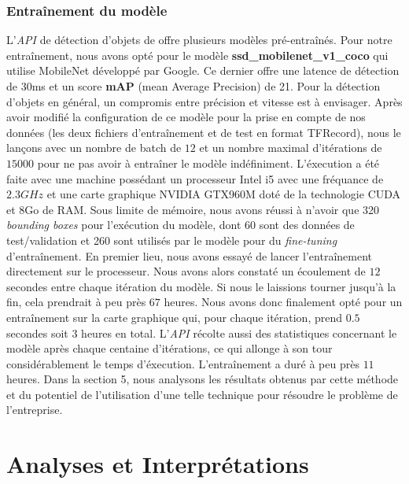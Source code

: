 \documentclass[french]{article}
\theoremstyle{mytheoremstyle}
\theoremstyle{mytheoremstyle}
\theoremstyle{myproblemstyle}
\begin{document}
        \subsubsection{Entraînement du modèle}
        L'\emph{API} de détection d'objets de offre plusieurs modèles pré-entraînés. Pour notre entraînement, nous avons opté pour le modèle \textbf{ssd\_mobilenet\_v1\_coco}\cite{pretrainedmodel} qui utilise MobileNet développé par Google. Ce dernier offre une latence de détection de 30ms et un score \textbf{mAP} (mean Average Precision) de 21. Pour la détection d'objets en général, un compromis entre précision et vitesse est à envisager. Après avoir modifié la configuration de ce modèle pour la prise en compte de nos données (les deux fichiers d'entraînement et de test en format TFRecord), nous le lançons avec un nombre de batch de $12$ et un nombre maximal d'itérations de $15 000$ pour ne pas avoir à entraîner le modèle indéfiniment. L'éxecution a été faite avec une machine possédant un processeur Intel i5 avec une fréquance de $2.3GHz$ et une carte graphique NVIDIA GTX960M doté de la technologie CUDA et 8Go de RAM. Sous limite de mémoire, nous avons réussi à n'avoir que 320 \emph{bounding boxes} pour l'exécution du modèle, dont 60 sont des données de test/validation et 260 sont utilisés par le modèle pour du \emph{fine-tuning} d'entraînement. En premier lieu, nous avons essayé de lancer l'entraînement directement sur le processeur. Nous avons alors constaté un écoulement de $12$ secondes entre chaque itération du modèle. Si nous le laissions tourner jusqu'à la fin, cela prendrait à peu près $67$ heures. Nous avons donc finalement opté pour un entraînement sur la carte graphique qui, pour chaque itération, prend $0.5$ secondes soit $3$ heures en total. L'\emph{API} récolte aussi des statistiques concernant le modèle après chaque centaine d'itérations, ce qui allonge à son tour considérablement le temps d'éxecution.
        \newline
        \indent L'entraînement a duré à peu près $11$ heures. Dans la section 5, nous analysons les résultats obtenus par cette méthode et du potentiel de l'utilisation d'une telle technique pour résoudre le problème de l'entreprise.

    \section{Analyses et Interprétations}
\end{document}
